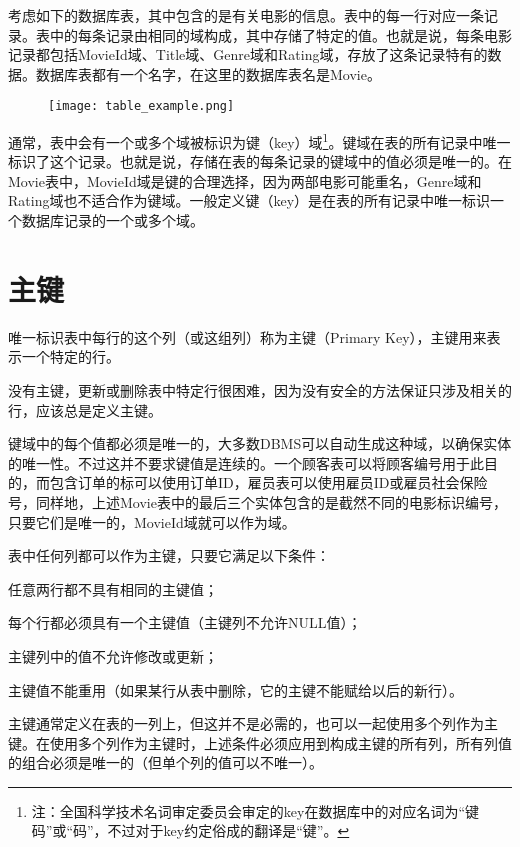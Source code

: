 考虑如下的数据库表，其中包含的是有关电影的信息。表中的每一行对应一条记录。表中的每条记录由相同的域构成，其中存储了特定的值。也就是说，每条电影记录都包括MovieId域、Title域、Genre域和Rating域，存放了这条记录特有的数据。数据库表都有一个名字，在这里的数据库表名是Movie。



\begin{figure}[!h]
\centering
\texttt{[image: table\_example.png]}
\label{table_example}
\end{figure}


通常，表中会有一个或多个域被标识为键（key）域\footnote{注：全国科学技术名词审定委员会审定的key在数据库中的对应名词为“键码”或“码”，不过对于key约定俗成的翻译是“键”。}。键域在表的所有记录中唯一标识了这个记录。也就是说，存储在表的每条记录的键域中的值必须是唯一的。在Movie表中，MovieId域是键的合理选择，因为两部电影可能重名，Genre域和Rating域也不适合作为键域。一般定义键（key）是在表的所有记录中唯一标识一个数据库记录的一个或多个域。


\section{主键}

唯一标识表中每行的这个列（或这组列）称为主键（Primary Key），主键用来表示一个特定的行。

没有主键，更新或删除表中特定行很困难，因为没有安全的方法保证只涉及相关的行，应该总是定义主键。

键域中的每个值都必须是唯一的，大多数DBMS可以自动生成这种域，以确保实体的唯一性。不过这并不要求键值是连续的。一个顾客表可以将顾客编号用于此目的，而包含订单的标可以使用订单ID，雇员表可以使用雇员ID或雇员社会保险号，同样地，上述Movie表中的最后三个实体包含的是截然不同的电影标识编号，只要它们是唯一的，MovieId域就可以作为域。

表中任何列都可以作为主键，只要它满足以下条件：

\begin{compactenum}
\item 任意两行都不具有相同的主键值；
\item 每个行都必须具有一个主键值（主键列不允许NULL值）；
\item 主键列中的值不允许修改或更新；
\item 主键值不能重用（如果某行从表中删除，它的主键不能赋给以后的新行）。
\end{compactenum}

主键通常定义在表的一列上，但这并不是必需的，也可以一起使用多个列作为主键。在使用多个列作为主键时，上述条件必须应用到构成主键的所有列，所有列值的组合必须是唯一的（但单个列的值可以不唯一）。


